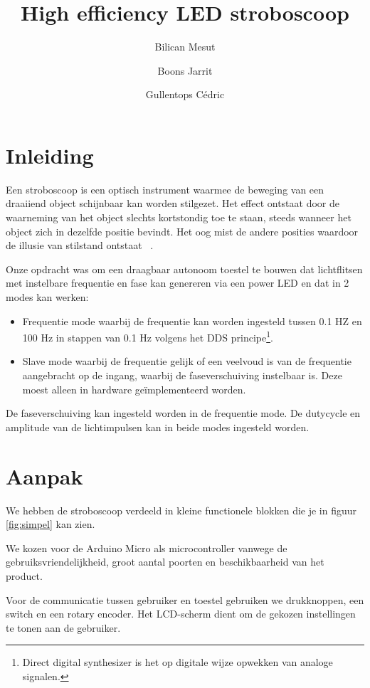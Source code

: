 \documentclass[a4paper,dutch]{article}
\title{High efficiency LED stroboscoop}
\author{Bilican Mesut \and Boons Jarrit \and Gullentops Cédric}
\date{}
\begin{document}
\maketitle

\section{Inleiding}

Een stroboscoop is een optisch instrument waarmee de beweging van een draaiiend object schijnbaar kan worden stilgezet. Het effect ontstaat door de waarneming van het object slechts kortstondig toe te staan, steeds wanneer het object zich in dezelfde positie bevindt. Het oog mist de andere posities waardoor de illusie van stilstand ontstaat ~\cite{wiki:Stroboscoop}.%

Onze opdracht was om een draagbaar autonoom toestel te bouwen dat lichtflitsen met instelbare frequentie en fase kan genereren via een power LED en dat in 2 modes kan werken:
\begin{itemize}
\item Frequentie mode waarbij de frequentie kan worden ingesteld tussen 0.1 HZ en 100 Hz in stappen van 0.1 Hz volgens het DDS principe\footnote{Direct digital synthesizer is het op digitale wijze opwekken van analoge signalen.}. %
\item Slave mode waarbij de frequentie gelijk of een veelvoud is van de frequentie aangebracht op de ingang, waarbij de faseverschuiving instelbaar is. Deze moest alleen in hardware geïmplementeerd worden.
\end{itemize}

De faseverschuiving kan ingesteld worden in de frequentie mode. De dutycycle en amplitude van de lichtimpulsen kan in beide modes ingesteld worden.

\section{Aanpak}
We hebben de stroboscoop verdeeld in kleine functionele blokken die je in figuur \ref{fig:simpel} kan zien.

We kozen voor de Arduino Micro als microcontroller vanwege de gebruiksvriendelijkheid, groot aantal poorten en beschikbaarheid van het product.

Voor de communicatie tussen gebruiker en toestel gebruiken we drukknoppen, een switch en een rotary encoder. Het LCD-scherm dient om de gekozen instellingen te tonen aan de gebruiker.
\end{document}
